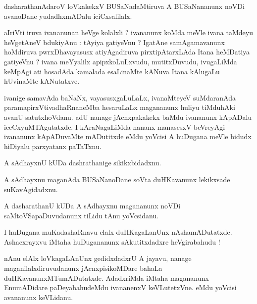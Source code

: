\documentclass{article}
\begin{document}
\begin{mn}
dasharathanAdaroV  loVkakekxV  BUSaNadaMtiruva  A  BUSaNananunx  noVDi  avanoDane  yudadhxmADalu  iciCxsalilalx.
\end{mn}

\begin{mn}
aIriVti  iruva  ivananunan  heVge  kolalxli ?  ivananunx  koMda  meVle  ivana  taMdeyu  heVgetAneV  
bdukiyAnu :  tAyiya  gatiyeVnu ?  IgatAne  samAgamavanunx  hoMdiruva  pwrxDhavayasusx  atiyAgadiruva  
pirxtipAtarxLAda  Itana  heMDatiya  gatiyeVnu ?  ivana  meYyalilx  apipxkoLuLxvudu,  mutitxDuvudu,  
ivugaLiMda  keMpAgi  ati  hosadAda  kamalada  esaLinaMte  kANuva  Itana  kAlugaLu  hUvinaMte  kANutatxve.
\end{mn}

\begin{mn}
ivanige  samavAda  baNaNx,  vayasusxgaLuLaLx,  ivanaMteyeV  suMdaranAda  paramapirxVtivadhaRnaneMba  hesaruLaLx  
magananunx  huliyu  tiMduhAki  avanU  satutxhoVdanu.  adU  nanage  jAcnxpakakekx  baMdu  ivananunx  kApADalu  
iceCxyuMTAgutatxde.  I  kAraNagaLiMda  nananx  manasesxV  beVreyAgi  ivananunx  kApADuvaMte  mADutitxde  eMdu  
yoVcisi  A  huDugana  meVle  bidudx  hiDiyalu  parxyatanx paTaTxnu.
\end{mn}

\begin{mn}
A  sAdhayxnU  kUDa  dashrathanige  sikikxbidadxnu.
\end{mn}

\begin{mn}
A  sAdhayxnu  maganAda  BUSaNanoDane  soVta  duHKavanunx  lekikxsade  suKavAgidadxnu.
\end{mn}

\begin{mn}
A  dasharathanU  kUDa  A  sAdhayxnu  magananunx  noVDi  saMtoVSapaDuvudanunx  tiLidu  tAnu  yoVcsidanu.
\end{mn}

\begin{mn}
I  huDugana  muKadashaRnavu  elalx  duHKagaLanUnx  nAshamADutatxde.  Ashacxrayxvu  iMtaha  huDugananunx  
sAkutitxdadxre  heVgirabahudu !
\end{mn}

\begin{mn}
nAnu  elAlx  loVkagaLAnUnx  gedidxdadxrU  A  jayavu,  nanage  maganilalxdiruvudanunx  jAcnxpisikoMDare  
bahaLa  duHKavanunxMTumADutatxde.  AdadxriMda  iMtaha  magananunx  EnumADidare  paDeyabahudeMdu  
ivananenxV  keVLutetxVne.  eMdu  yoVcisi  avananunx  keVLidanu.
\end{mn}
\end{document}
